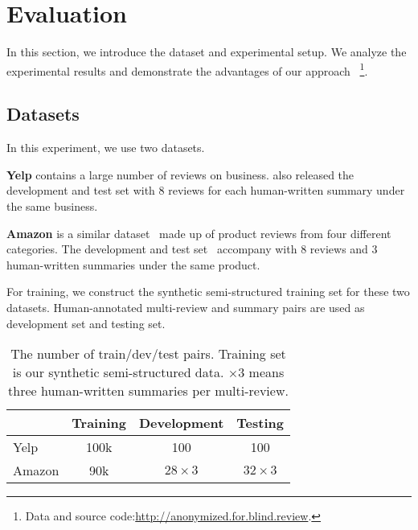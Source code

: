 \section{Evaluation}
\label{sec:eval}
In this section, we introduce the dataset and experimental setup.
We analyze the experimental results
and demonstrate the advantages of our approach
~\footnote{ Data and source code:\url{http://anonymized.for.blind.review}.}.

\subsection{Datasets}
In this experiment, we use two datasets.


\textbf{Yelp} 
contains a large number of reviews on business.
\citet{MeanSum19} also released the development and test set with 8 reviews for each human-written summary under the same business.

\textbf{Amazon} 
is a similar dataset~\cite{HeM16} made up of product reviews from four different categories. %
The development and test set~\cite{Copycat20} accompany with 8 reviews and 3 human-written summaries under the same product.

For training, we construct the synthetic semi-structured training set for these two datasets.
Human-annotated multi-review and summary pairs
are used as development set and testing set.  

\begin{table}[th]
	\small
	\centering
	\begin{tabular}{|l|c|c|c|}
		\hline
		\textbf{} & \textbf{Training} &\textbf{Development} & \textbf{Testing}\\
		\hline
		Yelp & 100k & 100 & 100 \\
		Amazon & 90k & $28\times3$ & $32\times3$ \\
		\hline
	\end{tabular}
	\caption{%
		The number of  train/dev/test pairs. 
		Training set is our synthetic semi-structured data. 
		$\times3$ means three human-written  summaries per multi-review.}
	\label{tab:datasets}
\end{table}

